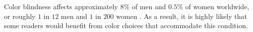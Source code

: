 


\noindent Color blindness affects approximately $8\%$ of men and $0.5\%$ of women worldwide, or roughly $1$ in $12$ men and $1$ in $200$ women \cite{Gordon1998}.
As a result, it is highly likely that some readers would benefit from color choices that accommodate this condition.
